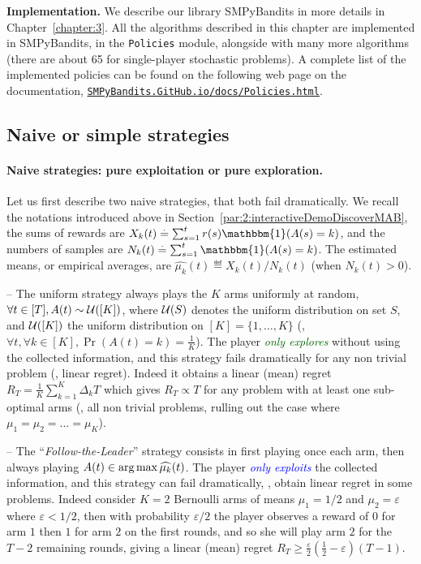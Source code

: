 \textbf{Implementation.}
%
We describe our library SMPyBandits in more details in Chapter~\ref{chapter:3}.
All the algorithms described in this chapter are implemented in SMPyBandits, in the \texttt{Policies} module, alongside with many more algorithms (there are about 65 for single-player stochastic problems).
A complete list of the implemented policies can be found on the following web page on the documentation,
\href{https://smpybandits.github.io/docs/Policies.html}{\texttt{SMPyBandits.GitHub.io/docs/Policies.html}}.


\subsection{Naive or simple strategies}
\label{sub:2:naiveSimpleStrategies}


\paragraph{Naive strategies: pure exploitation or pure exploration.}

Let us first describe two naive strategies, that both fail dramatically.
We recall the notations introduced above in Section~\ref{par:2:interactiveDemoDiscoverMAB}, the sums of rewards are $X_k(t) \eqdef \sum_{s=1}^t r(s) \mathbbm{1}(A(s) = k)$, and the numbers of samples are $N_k(t) \eqdef \sum_{s=1}^t \mathbbm{1}(A(s) = k)$.
%
The estimated means, or empirical averages, are $\widehat{\mu_k}(t) \eqdef X_k(t) / N_k(t)$ (when $N_k(t)>0$).

-- The uniform strategy always plays the $K$ arms uniformly at random,
$\forall t\in[T], A(t) \sim \mathcal{U}([K])$, where $\mathcal{U}(S)$ denotes the uniform distribution on set $S$, and $\mathcal{U}([K])$ the uniform distribution on $[K] = \{1,\dots,K\}$ (\ie, $\forall t, \forall k\in[K], \Pr(A(t) = k) = \frac{1}{K}$).
%
The player \textcolor{darkgreen}{\emph{only explores}} without using the collected information, and this strategy fails dramatically for any non trivial problem (\ie, linear regret).
Indeed it obtains a linear (mean) regret $R_T = \frac{1}{K} \sum_{k=1}^K \Delta_k T$
which gives $R_T \propto T$ for any problem with at least one sub-optimal arms (\ie, all non trivial problems, rulling out the case where $\mu_1=\mu_2=\dots=\mu_K$).

-- The ``\emph{Follow-the-Leader}'' strategy consists in first playing once each arm, then always playing $A(t)\in\operatorname*{arg\,max} \widehat{\mu_k}(t)$.
The player \textcolor{blue}{\emph{only exploits}} the collected information, and this strategy can fail dramatically, \ie, obtain linear regret in some problems.
Indeed consider $K=2$ Bernoulli arms of means $\mu_1=1/2$ and $\mu_2=\varepsilon$ where $\varepsilon < 1/2$, then with probability $\varepsilon/2$ the player observes a reward of $0$ for arm $1$ then $1$ for arm $2$ on the first rounds, and so she will play arm $2$ for the $T-2$ remaining rounds, giving a linear (mean) regret $R_T \geq \frac{\varepsilon}{2}\left(\frac{1}{2} - \varepsilon\right) (T-1)$.

